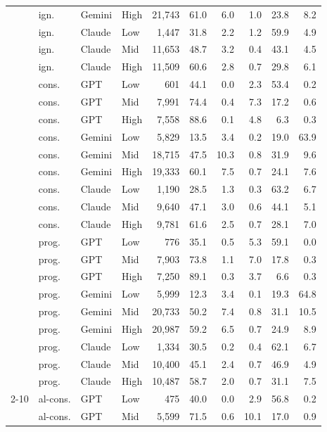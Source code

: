 \begin{table}[t]
\begin{tabular}{llllrrrrrr}
 & ign. & Gemini & High & 21{,}743 & 61.0 & 6.0 & 1.0 & 23.8 & 8.2 \\
 & ign. & Claude & Low & 1{,}447 & 31.8 & 2.2 & 1.2 & 59.9 & 4.9 \\
 & ign. & Claude & Mid & 11{,}653 & 48.7 & 3.2 & 0.4 & 43.1 & 4.5 \\
 & ign. & Claude & High & 11{,}509 & 60.6 & 2.8 & 0.7 & 29.8 & 6.1 \\
 & cons. & GPT & Low & 601 & 44.1 & 0.0 & 2.3 & 53.4 & 0.2 \\
 & cons. & GPT & Mid & 7{,}991 & 74.4 & 0.4 & 7.3 & 17.2 & 0.6 \\
 & cons. & GPT & High & 7{,}558 & 88.6 & 0.1 & 4.8 & 6.3 & 0.3 \\
 & cons. & Gemini & Low & 5{,}829 & 13.5 & 3.4 & 0.2 & 19.0 & 63.9 \\
 & cons. & Gemini & Mid & 18{,}715 & 47.5 & 10.3 & 0.8 & 31.9 & 9.6 \\
 & cons. & Gemini & High & 19{,}333 & 60.1 & 7.5 & 0.7 & 24.1 & 7.6 \\
 & cons. & Claude & Low & 1{,}190 & 28.5 & 1.3 & 0.3 & 63.2 & 6.7 \\
 & cons. & Claude & Mid & 9{,}640 & 47.1 & 3.0 & 0.6 & 44.1 & 5.1 \\
 & cons. & Claude & High & 9{,}781 & 61.6 & 2.5 & 0.7 & 28.1 & 7.0 \\
 & prog. & GPT & Low & 776 & 35.1 & 0.5 & 5.3 & 59.1 & 0.0 \\
 & prog. & GPT & Mid & 7{,}903 & 73.8 & 1.1 & 7.0 & 17.8 & 0.3 \\
 & prog. & GPT & High & 7{,}250 & 89.1 & 0.3 & 3.7 & 6.6 & 0.3 \\
 & prog. & Gemini & Low & 5{,}999 & 12.3 & 3.4 & 0.1 & 19.3 & 64.8 \\
 & prog. & Gemini & Mid & 20{,}733 & 50.2 & 7.4 & 0.8 & 31.1 & 10.5 \\
 & prog. & Gemini & High & 20{,}987 & 59.2 & 6.5 & 0.7 & 24.9 & 8.9 \\
 & prog. & Claude & Low & 1{,}334 & 30.5 & 0.2 & 0.4 & 62.1 & 6.7 \\
 & prog. & Claude & Mid & 10{,}400 & 45.1 & 2.4 & 0.7 & 46.9 & 4.9 \\
 & prog. & Claude & High & 10{,}487 & 58.7 & 2.0 & 0.7 & 31.1 & 7.5 \\
\cmidrule(lr){2-10}
 & al-cons. & GPT & Low & 475 & 40.0 & 0.0 & 2.9 & 56.8 & 0.2 \\
 & al-cons. & GPT & Mid & 5{,}599 & 71.5 & 0.6 & 10.1 & 17.0 & 0.9 \\

\end{tabular}
\end{table}
